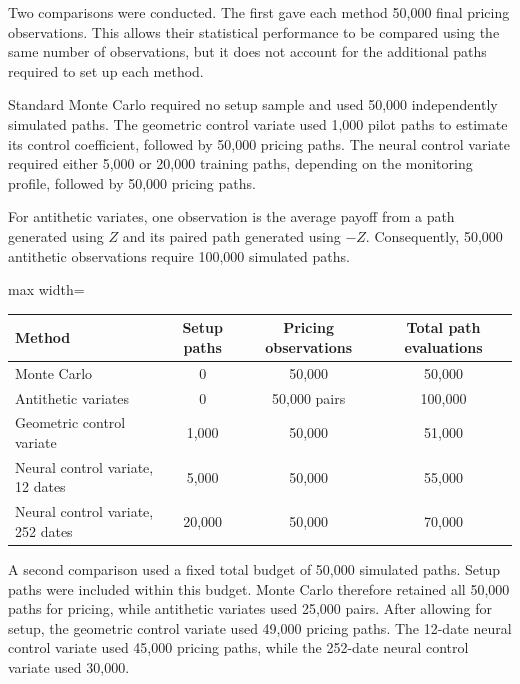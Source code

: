 Two comparisons were conducted. The first gave each method 50,000 final pricing observations. This allows their statistical performance to be compared using the same number of observations, but it does not account for the additional paths required to set up each method.

Standard Monte Carlo required no setup sample and used 50,000 independently simulated paths. The geometric control variate used 1,000 pilot paths to estimate its control coefficient, followed by 50,000 pricing paths. The neural control variate required either 5,000 or 20,000 training paths, depending on the monitoring profile, followed by 50,000 pricing paths.

For antithetic variates, one observation is the average payoff from a path generated using $Z$ and its paired path generated using $-Z$. Consequently, 50,000 antithetic observations require 100,000 simulated paths.

\begin{table}[h]
\centering
\begin{adjustbox}{max width=\textwidth}
\begin{tabular}{lccc}
\hline
Method & Setup paths & Pricing observations & Total path evaluations \\
\hline
Monte Carlo & 0 & 50,000 & 50,000 \\
Antithetic variates & 0 & 50,000 pairs & 100,000 \\
Geometric control variate & 1,000 & 50,000 & 51,000 \\
Neural control variate, 12 dates & 5,000 & 50,000 & 55,000 \\
Neural control variate, 252 dates & 20,000 & 50,000 & 70,000 \\
\hline
\end{tabular}
\end{adjustbox}
\end{table}

A second comparison used a fixed total budget of 50,000 simulated paths. Setup paths were included within this budget. Monte Carlo therefore retained all 50,000 paths for pricing, while antithetic variates used 25,000 pairs. After allowing for setup, the geometric control variate used 49,000 pricing paths. The 12-date neural control variate used 45,000 pricing paths, while the 252-date neural control variate used 30,000.

